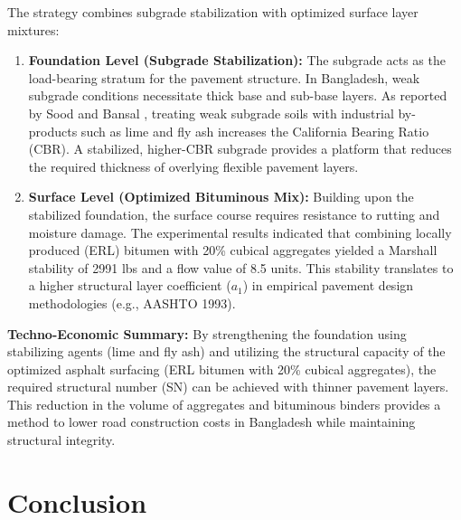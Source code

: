 \documentclass[12pt,a4paper]{article}
\begin{document}
The strategy combines subgrade stabilization with optimized surface layer mixtures:

\begin{enumerate}
    \item \textbf{Foundation Level (Subgrade Stabilization):} The subgrade acts as the load-bearing stratum for the pavement structure. In Bangladesh, weak subgrade conditions necessitate thick base and sub-base layers. As reported by Sood and Bansal \cite{sood2015evaluation}, treating weak subgrade soils with industrial by-products such as lime and fly ash increases the California Bearing Ratio (CBR). A stabilized, higher-CBR subgrade provides a platform that reduces the required thickness of overlying flexible pavement layers.
    \item \textbf{Surface Level (Optimized Bituminous Mix):} Building upon the stabilized foundation, the surface course requires resistance to rutting and moisture damage. The experimental results indicated that combining locally produced (ERL) bitumen with 20\% cubical aggregates yielded a Marshall stability of 2991 lbs and a flow value of 8.5 units. This stability translates to a higher structural layer coefficient ($a_1$) in empirical pavement design methodologies (e.g., AASHTO 1993).
\end{enumerate}

\textbf{Techno-Economic Summary:}
By strengthening the foundation using stabilizing agents (lime and fly ash) and utilizing the structural capacity of the optimized asphalt surfacing (ERL bitumen with 20\% cubical aggregates), the required structural number (SN) can be achieved with thinner pavement layers. This reduction in the volume of aggregates and bituminous binders provides a method to lower road construction costs in Bangladesh while maintaining structural integrity.

\section{Conclusion}
\end{document}
